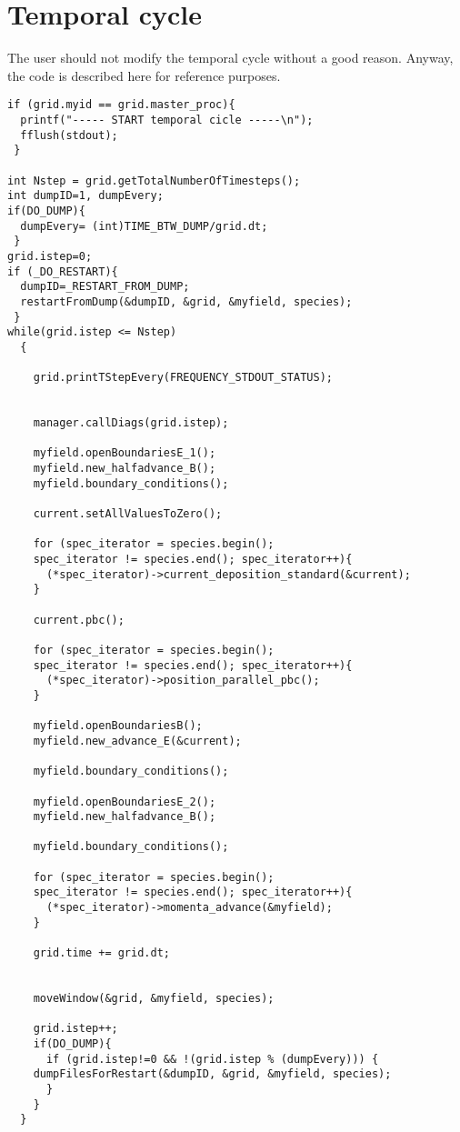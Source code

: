 \documentclass[11pt,a4paper]{report}
\begin{document}
\section{Temporal cycle}
The user should not modify the temporal cycle without a good reason. Anyway, the code is described here for reference purposes.
\begin{lstlisting}[backgroundcolor=\color{no_modify}]
if (grid.myid == grid.master_proc){
  printf("----- START temporal cicle -----\n");
  fflush(stdout);
 }

int Nstep = grid.getTotalNumberOfTimesteps();
int dumpID=1, dumpEvery;
if(DO_DUMP){
  dumpEvery= (int)TIME_BTW_DUMP/grid.dt;
 }
grid.istep=0;
if (_DO_RESTART){
  dumpID=_RESTART_FROM_DUMP;
  restartFromDump(&dumpID, &grid, &myfield, species);
 }
while(grid.istep <= Nstep)
  {
			
    grid.printTStepEvery(FREQUENCY_STDOUT_STATUS);
			
			
    manager.callDiags(grid.istep); 
			
    myfield.openBoundariesE_1();
    myfield.new_halfadvance_B();
    myfield.boundary_conditions();
			
    current.setAllValuesToZero();
			
    for (spec_iterator = species.begin();
    spec_iterator != species.end(); spec_iterator++){
      (*spec_iterator)->current_deposition_standard(&current);
    }
			
    current.pbc();
			
    for (spec_iterator = species.begin();
    spec_iterator != species.end(); spec_iterator++){
      (*spec_iterator)->position_parallel_pbc();
    }	
			
    myfield.openBoundariesB();
    myfield.new_advance_E(&current);
			
    myfield.boundary_conditions();
			
    myfield.openBoundariesE_2();
    myfield.new_halfadvance_B();
			
    myfield.boundary_conditions();
			
    for (spec_iterator = species.begin();
    spec_iterator != species.end(); spec_iterator++){
      (*spec_iterator)->momenta_advance(&myfield);
    }
			
    grid.time += grid.dt;
			
			
    moveWindow(&grid, &myfield, species);

    grid.istep++;
    if(DO_DUMP){
      if (grid.istep!=0 && !(grid.istep % (dumpEvery))) {
	dumpFilesForRestart(&dumpID, &grid, &myfield, species);
      }
    }
  }

\end{lstlisting}
\end{document}
